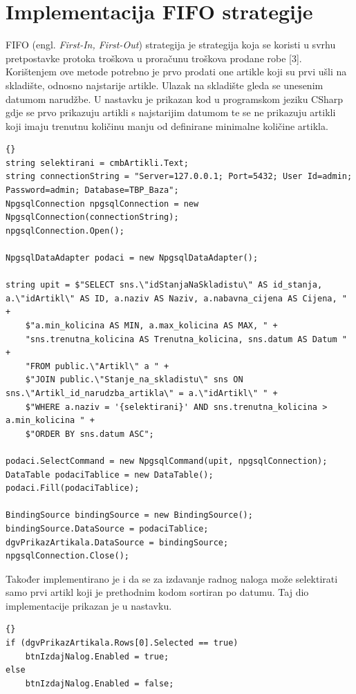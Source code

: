 \documentclass{foi}
\begin{document}
\section{Implementacija FIFO strategije}
FIFO (engl. \emph{First-In, First-Out}) strategija je strategija koja se koristi u svrhu pretpostavke protoka troškova u proračunu troškova prodane robe [3]. Korištenjem ove metode potrebno je prvo prodati one artikle koji su prvi ušli na skladište, odnosno najstarije artikle. Ulazak na skladište gleda se unesenim datumom narudžbe.
U nastavku je prikazan kod u programskom jeziku CSharp gdje se prvo prikazuju artikli s najstarijim datumom te se ne prikazuju artikli koji imaju trenutnu količinu manju od definirane minimalne količine artikla.
\lstset{commentstyle=\textit,language=python}
\begin{lstlisting}[frame=tb]{}
string selektirani = cmbArtikli.Text;
string connectionString = "Server=127.0.0.1; Port=5432; User Id=admin; Password=admin; Database=TBP_Baza";
NpgsqlConnection npgsqlConnection = new NpgsqlConnection(connectionString);
npgsqlConnection.Open();

NpgsqlDataAdapter podaci = new NpgsqlDataAdapter();

string upit = $"SELECT sns.\"idStanjaNaSkladistu\" AS id_stanja, a.\"idArtikl\" AS ID, a.naziv AS Naziv, a.nabavna_cijena AS Cijena, " +
    $"a.min_kolicina AS MIN, a.max_kolicina AS MAX, " +
    "sns.trenutna_kolicina AS Trenutna_kolicina, sns.datum AS Datum " +
    "FROM public.\"Artikl\" a " +
    $"JOIN public.\"Stanje_na_skladistu\" sns ON sns.\"Artikl_id_narudzba_artikla\" = a.\"idArtikl\" " +
    $"WHERE a.naziv = '{selektirani}' AND sns.trenutna_kolicina > a.min_kolicina " +
    $"ORDER BY sns.datum ASC";
    
podaci.SelectCommand = new NpgsqlCommand(upit, npgsqlConnection);
DataTable podaciTablice = new DataTable();
podaci.Fill(podaciTablice);

BindingSource bindingSource = new BindingSource();
bindingSource.DataSource = podaciTablice;
dgvPrikazArtikala.DataSource = bindingSource;
npgsqlConnection.Close();
\end{lstlisting}

Također implementirano je i da se za izdavanje radnog naloga može selektirati samo prvi artikl koji je prethodnim kodom sortiran po datumu. Taj dio implementacije prikazan je u nastavku.
\lstset{commentstyle=\textit,language=python}
\begin{lstlisting}[frame=tb]{}
if (dgvPrikazArtikala.Rows[0].Selected == true)
    btnIzdajNalog.Enabled = true;
else
    btnIzdajNalog.Enabled = false;
\end{lstlisting}
\end{document}
